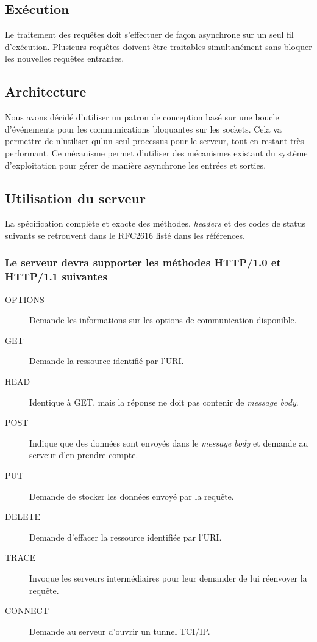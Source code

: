 \documentclass{scrreprt}
\begin{document}
\subsection{Exécution}
Le traitement des requêtes doit s'effectuer de façon asynchrone sur un seul fil
d'exécution. Plusieurs requêtes doivent être traitables simultanément sans bloquer
les nouvelles requêtes entrantes.
\subsection{Architecture}
Nous avons décidé d'utiliser un patron de conception basé sur
une boucle d’événements pour les communications bloquantes sur les sockets. Cela va 
permettre de n'utiliser qu'un seul processus pour le serveur, tout en restant très performant.
Ce mécanisme permet d'utiliser des mécanismes existant du système d'exploitation
pour gérer de manière asynchrone les entrées et sorties\cite{c10k}.



\subsection{Utilisation du serveur}
La spécification complète et exacte des méthodes, \textit{headers} et des codes de status suivants se retrouvent dans le RFC2616 listé dans les références.
\subsubsection{Le serveur devra supporter les méthodes HTTP/1.0 et HTTP/1.1 suivantes}
\begin{description}
 \item [OPTIONS] Demande les informations sur les options de communication disponible.
 \item [GET] Demande la ressource identifié par l'URI.
 \item [HEAD] Identique à GET, mais la réponse ne doit pas contenir de \textit{message body}.
 \item [POST] Indique que des données sont envoyés dans le \textit{message body} et demande au serveur d'en prendre compte.
 \item [PUT] Demande de stocker les données envoyé par la requête.
 \item [DELETE] Demande d'effacer la ressource identifiée par l'URI.
 \item [TRACE] Invoque les serveurs intermédiaires pour leur demander de lui réenvoyer la requête.
 \item [CONNECT] Demande au serveur d'ouvrir un tunnel TCI/IP.
\end{description}
\end{document}
